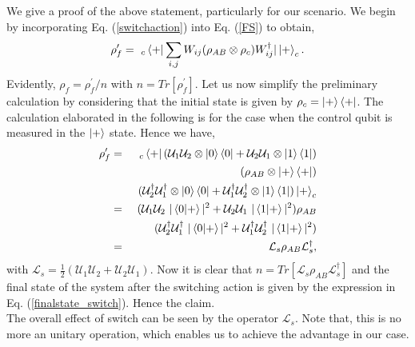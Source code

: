     \noindent We give a proof of the above statement, particularly for our scenario. We begin by incorporating Eq. (\ref{switchaction}) into Eq. (\ref{FS}) to obtain,
    \begin{equation}
        \rho^{\prime}_{f} =~ _c\bra{+}\sum_{i,j} W_{ij}(\rho_{AB} \otimes \rho_c)W_{ij}^{\dagger}|\ket{+}_c.
    \end{equation}
    Evidently, $\rho_f= \rho^{\prime}_{f}/n$ with $n= Tr [\rho^{\prime}_{f}]$. Let us now simplify the preliminary calculation by considering that the initial state is given by $\rho_c=\ket{+}\bra{+}$. The calculation elaborated in the following is for the case when the control qubit is measured in the $\ket{+}$ state. Hence we have,
    \begin{eqnarray}
        \rho^{\prime}_{f} &=~& _c\bra{+} (\mathcal{U}_1 \mathcal{U}_2 \otimes \ket{0}\bra{0} + \mathcal{U}_2 \mathcal{U}_1 \otimes \ket{1}\bra{1}) \nonumber\\
        &&(\rho_{AB}\otimes \ket{+}\bra{+}) \nonumber\\
        &&(\mathcal{U}^{\dagger}_2 \mathcal{U}^{\dagger}_1 \otimes \ket{0}\bra{0} + \mathcal{U}^{\dagger}_1 \mathcal{U}^{\dagger}_2 \otimes \ket{1}\bra{1}) \ket{+}_c \nonumber\\
        &=& (\mathcal{U}_1 \mathcal{U}_2~|\braket{0|+}|^2 + \mathcal{U}_2 \mathcal{U}_1~|\braket{1|+}|^2 ) \rho_{AB} \nonumber\\
        && (\mathcal{U}^{\dagger}_2 \mathcal{U}^{\dagger}_1~ |\braket{0|+}|^2 + \mathcal{U}^{\dagger}_1 \mathcal{U}^{\dagger}_2~|\braket{1|+}|^2 ) \nonumber\\
        &=& \mathcal{L}_s \rho_{AB} \mathcal{L}^{\dagger}_s, 
    \end{eqnarray}
    with $\mathcal{L}_s=\frac{1}{2}(\mathcal{U}_1 \mathcal{U}_2+\mathcal{U}_2 \mathcal{U}_1)$. Now it is clear that $n=Tr[\mathcal{L}_s \rho_{AB} \mathcal{L}^{\dagger}_s]$ and the final state of the system after the switching action is given by the expression in Eq. (\ref{finalstate_switch}). Hence the claim.\\
The overall effect of switch can be seen by the operator $\mathcal{L}_s$. Note that, this is no more an unitary operation, which enables us to achieve the advantage in our case. 
